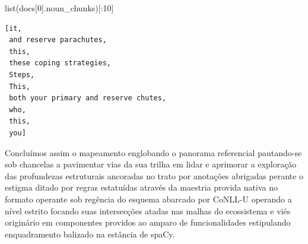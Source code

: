 \documentclass[
  brazilian,
]{article}
\newenvironment{Shaded}{}{}
\newcommand{\BuiltInTok}[1]{#1}
\newcommand{\DecValTok}[1]{\textcolor[rgb]{0.25,0.63,0.44}{#1}}
\newcommand{\NormalTok}[1]{#1}
\begin{document}
\begin{Shaded}
\begin{Highlighting}[]
\BuiltInTok{list}\NormalTok{(docs[}\DecValTok{0}\NormalTok{].noun\_chunks)[:}\DecValTok{10}\NormalTok{]}
\end{Highlighting}
\end{Shaded}

\begin{verbatim}
[it,
 and reserve parachutes,
 this,
 these coping strategies,
 Steps,
 This,
 both your primary and reserve chutes,
 who,
 this,
 you]
\end{verbatim}

Concluímos assim o mapeamento englobando o panorama referencial
pautando-se sob chancelas a pavimentar vias da sua trilha em lidar e
aprimorar a exploração das profundezas estruturais ancoradas no trato
por anotações abrigadas perante o estigma ditado por regras estatuídas
através da maestria provida nativa no formato operante sob regência do
esquema abarcado por CoNLL-U operando a nível estrito focando suas
intersecções atadas nas malhas do ecossistema e viés originário em
componentes providos ao amparo de funcionalidades estipulando
enquadramento balizado na estância de spaCy.
\end{document}
